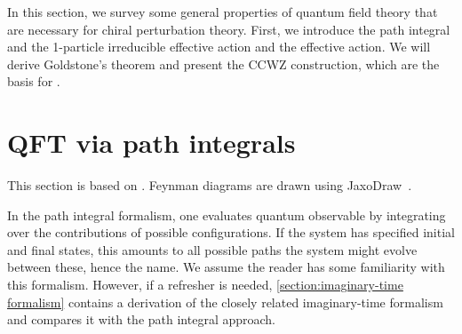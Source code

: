 In this section, we survey some general properties of quantum field theory that are necessary for chiral perturbation theory.
First, we introduce the path integral and the 1-particle irreducible effective action and the effective action.
We will derive Goldstone's theorem and present the CCWZ construction, which are the basis for \chpt.

\section{QFT via path integrals}
\label{section:path integral}

This section is based on \cite{Peskin:IntroQFT,weinberg_1995,weinberg_1996_vol2,Schwartz:QFT}.
Feynman diagrams are drawn using JaxoDraw~\cite{JaxoDraw}.

In the path integral formalism, one evaluates quantum observable by integrating over the contributions of possible configurations.
If the system has specified initial and final states, this amounts to all possible paths the system might evolve between these, hence the name.
We assume the reader has some familiarity with this formalism. 
However, if a refresher is needed, \autoref{section:imaginary-time formalism} contains a derivation of the closely related imaginary-time formalism and compares it with the path integral approach.

